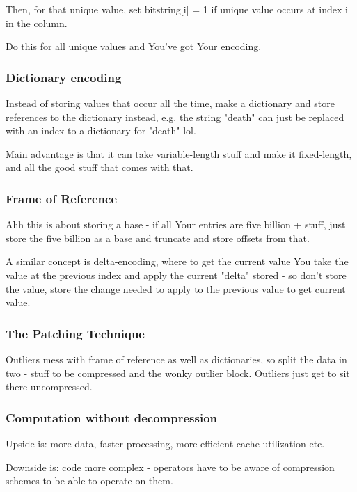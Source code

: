 \documentclass{article}
\begin{document}
			Then, for that unique value, set bitstring[i] = 1 if unique value occurs at index i in the column.
			
			Do this for all unique values and You've got Your encoding.
			
		\subsubsection{Dictionary encoding}
			
			Instead of storing values that occur all the time, make a dictionary and store references to the dictionary instead, e.g. the string "death" can just be replaced with an index to a dictionary for "death" lol.
			
			Main advantage is that it can take variable-length stuff and make it fixed-length, and all the good stuff that comes with that.
			
		\subsubsection{Frame of Reference}
			
			Ahh this is about storing a base - if all Your entries are five billion + stuff, just store  the five billion as a base and truncate and store offsets from that.
			
			A similar concept is delta-encoding, where to get the current value You take the value at the previous index and apply the current "delta" stored - so don't store the value, store the change needed to apply to the previous value to get current value.
			
		\subsubsection{The Patching Technique}
		
			Outliers mess with frame of reference as well as dictionaries, so split the data in two - stuff to be compressed and the wonky outlier block. Outliers just get to sit there uncompressed.
	
		\subsubsection{Computation without decompression}
			
			Upside is: more data, faster processing, more efficient cache utilization etc.
			
			Downside is: code more complex - operators have to be aware of compression schemes to be able to operate on them.
			
\end{document}
